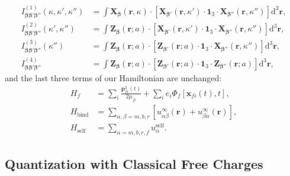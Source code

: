\documentclass{article}
\begin{document}
\begin{equation}
\begin{split}
I_{\bm{\beta}\bm{\beta}'\bm{\beta}''}^{(1)}(\kappa,\kappa',\kappa'') &= \int\mathbf{X}_{\bm{\beta}}(\mathbf{r},\kappa)\cdot\left[\mathbf{X}_{\bm{\beta}'}(\mathbf{r},\kappa')\cdot\bm{1}_3\cdot\mathbf{X}_{\bm{\beta}''}(\mathbf{r},\kappa'')\right]\mathrm{d}^3\mathbf{r},\\
I_{\bm{\beta}\bm{\beta}'\bm{\beta}''}^{(2)}(\kappa',\kappa'') &= \int\mathbf{Z}_{\bm{\beta}}(\mathbf{r};a)\cdot\left[\mathbf{X}_{\bm{\beta}'}(\mathbf{r},\kappa')\cdot\bm{1}_3\cdot\mathbf{X}_{\bm{\beta}''}(\mathbf{r},\kappa'')\right]\mathrm{d}^3\mathbf{r},\\
I_{\bm{\beta}\bm{\beta}'\bm{\beta}''}^{(3)}(\kappa'') &= \int\mathbf{Z}_{\bm{\beta}}(\mathbf{r};a)\cdot\left[\mathbf{Z}_{\bm{\beta}'}(\mathbf{r};a)\cdot\bm{1}_3\cdot\mathbf{X}_{\bm{\beta}''}(\mathbf{r},\kappa'')\right]\mathrm{d}^3\mathbf{r},\\
I_{\bm{\beta}\bm{\beta}'\bm{\beta}''}^{(4)} &= \int\mathbf{Z}_{\bm{\beta}}(\mathbf{r};a)\cdot\left[\mathbf{Z}_{\bm{\beta}'}(\mathbf{r};a)\cdot\bm{1}_3\cdot\mathbf{Z}_{\bm{\beta}''}(\mathbf{r};a)\right]\mathrm{d}^3\mathbf{r},
\end{split}
\end{equation}
and the last three terms of our Hamiltonian are unchanged:
\begin{equation}
\begin{split}
H_f &= \sum_i\frac{\mathbf{p}_{fi}^2(t)}{2\mu_{fi}} + \sum_ie_i\Phi_f[\mathbf{x}_{fi}(t),t],\\
H_\mathrm{bind} &= \sum_{\alpha,\beta = m,b,r}\left[u_{\alpha\beta}^\infty(\mathbf{r}) + u_{\beta\alpha}^\infty(\mathbf{r})\right],\\
H_\mathrm{self} &= \sum_{\alpha = m,b,r,f}u_\alpha^\mathrm{self}.
\end{split}
\end{equation}



















\newpage
\subsection{Quantization with Classical Free Charges}\label{sec:quantization}
\end{document}
